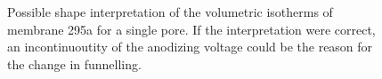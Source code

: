 \documentclass[../../thesis.tex]{subfiles}
\begin{document}
\begin{figure}[ht]
    \centering
    \caption{Possible shape interpretation of the volumetric isotherms of membrane 295a for a single pore. If the interpretation were correct, an incontinuoutity of the anodizing voltage could be the reason for the change in funnelling.}
    \label{fig:weird-funnelling}
\end{figure}
\end{document}
